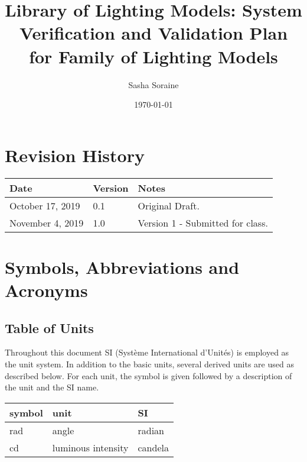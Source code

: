 \documentclass[12pt, titlepage]{article}
\begin{document}
\title{Library of Lighting Models: System Verification and Validation Plan for 
Family of Lighting Models} 
\author{Sasha Soraine}
\date{\today}
	
\maketitle


\section{Revision History}

\begin{tabularx}{\textwidth}{p{3cm}p{2cm}X}
\toprule {\bf Date} & {\bf Version} & {\bf Notes}\\
\midrule
October 17, 2019 & 0.1 & Original Draft.\\
November 4, 2019 & 1.0 & Version 1 - Submitted for class.\\
\bottomrule
\end{tabularx}

\newpage

\tableofcontents

\listoftables

\listoffigures

\newpage

\section{Symbols, Abbreviations and Acronyms}
\subsection{Table of Units}

Throughout this document SI (Syst\`{e}me International d'Unit\'{e}s) is employed
as the unit system.  In addition to the basic units, several derived units are
used as described below.  For each unit, the symbol is given followed by a
description of the unit and the SI name.
~\newline

\renewcommand{\arraystretch}{1.2}
\noindent \begin{tabular}{l l l} 
	\toprule		
	\textbf{symbol} & \textbf{unit} & \textbf{SI}\\
	\midrule 
	\si{\radian} & angle & radian\\
	\si{cd} & luminous intensity & candela\\	
	\bottomrule
\end{tabular}
\end{document}
